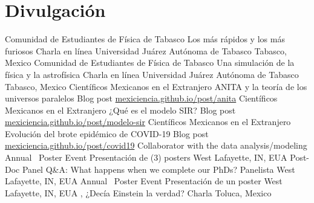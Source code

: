 \section{Divulgación}

%
{Comunidad de Estudiantes de Física de Tabasco}%
{Los más rápidos y los más furiosos}%
{Charla en línea}%
{Universidad Juárez Autónoma de Tabasco}%
{Tabasco, Mexico}
%
{Comunidad de Estudiantes de Física de Tabasco}%
{Una simulación de la física y la astrofísica}%
{Charla en línea}%
{Universidad Juárez Autónoma de Tabasco}%
{Tabasco, Mexico}
%
{Científicos Mexicanos en el Extranjero}%
{ANITA y la teoría de los universos paralelos}%
{Blog post}%
{\href{https://mexiciencia.github.io/post/anita/}{mexiciencia.github.io/post/anita}}%
{}
%
{Científicos Mexicanos en el Extranjero}%
{¿Qué es el modelo SIR?}%
{Blog post}%
{\href{https://mexiciencia.github.io/post/modelo-sir/}{mexiciencia.github.io/post/modelo-sir}}%
{}
%
{Científicos Mexicanos en el Extranjero}%
{Evolución del brote epidémico de COVID-19}%
{Blog post}%
{\href{https://mexiciencia.github.io/post/covid19/}{mexiciencia.github.io/post/covid19}}%
{Collaborator with the data analysis/modeling}
%
{\DPA}%
{Annual \DPA\ Poster Event}%
{Presentación de (3) posters}%
{\Purdue}%
{West Lafayette, IN, EUA}
%
{\DPA}%
{Post-Doc Panel Q\&A: What happens when we complete our PhDs?}%
{Panelista}%
{\Purdue}%
{West Lafayette, IN, EUA}
%
{\DPA}%
{Annual \DPA\ Poster Event}%
{Presentación de un poster}%
{\Purdue}%
{West Lafayette, IN, EUA}
%
{\FCes, \UAEMes}%
{¿Decía Einstein la verdad?}%
{Charla}%
{}%
{Toluca, Mexico}

